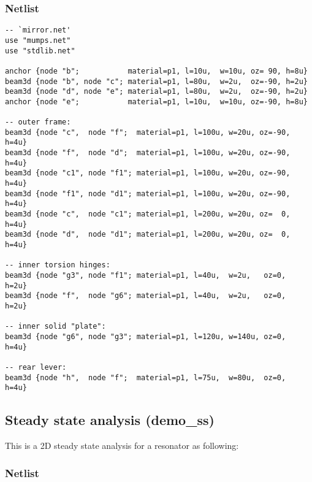 \subsubsection*{Netlist}

\begin{verbatim}
-- `mirror.net' 
use "mumps.net"
use "stdlib.net"

anchor {node "b";           material=p1, l=10u,  w=10u, oz= 90, h=8u}
beam3d {node "b", node "c"; material=p1, l=80u,  w=2u,  oz=-90, h=2u}
beam3d {node "d", node "e"; material=p1, l=80u,  w=2u,  oz=-90, h=2u}
anchor {node "e";           material=p1, l=10u,  w=10u, oz=-90, h=8u}

-- outer frame:
beam3d {node "c",  node "f";  material=p1, l=100u, w=20u, oz=-90, h=4u}
beam3d {node "f",  node "d";  material=p1, l=100u, w=20u, oz=-90, h=4u}
beam3d {node "c1", node "f1"; material=p1, l=100u, w=20u, oz=-90, h=4u}
beam3d {node "f1", node "d1"; material=p1, l=100u, w=20u, oz=-90, h=4u}
beam3d {node "c",  node "c1"; material=p1, l=200u, w=20u, oz=  0, h=4u}
beam3d {node "d",  node "d1"; material=p1, l=200u, w=20u, oz=  0, h=4u}

-- inner torsion hinges:
beam3d {node "g3", node "f1"; material=p1, l=40u,  w=2u,   oz=0,  h=2u}
beam3d {node "f",  node "g6"; material=p1, l=40u,  w=2u,   oz=0,  h=2u}

-- inner solid "plate":
beam3d {node "g6", node "g3"; material=p1, l=120u, w=140u, oz=0,  h=4u}

-- rear lever:
beam3d {node "h",  node "f";  material=p1, l=75u,  w=80u,  oz=0,  h=4u}
\end{verbatim}  


\subsection{Steady state analysis (demo\_ss)}

This is a 2D steady state analysis for a resonator as following:  

\subsubsection*{Netlist}

